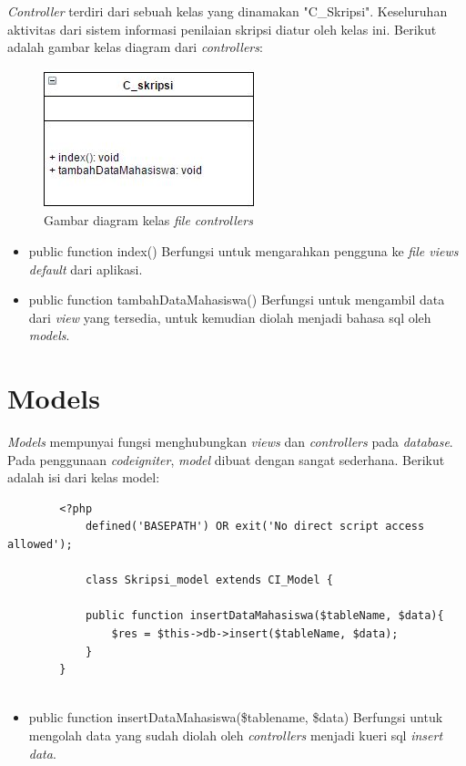 	\textit{Controller} terdiri dari sebuah kelas yang dinamakan "C\_Skripsi". Keseluruhan aktivitas dari sistem informasi penilaian skripsi diatur oleh kelas ini. Berikut adalah gambar kelas diagram dari \textit{controllers}:
	\begin{figure}[H]
		\centering
		\includegraphics[scale= 1.0]{Gambar/C_skripsi}
		\caption {Gambar diagram kelas \textit{file controllers}}
		\label{fig:controllers}
	\end{figure}
	
	\begin{itemize}
		\item public function index()
		Berfungsi untuk mengarahkan pengguna ke \textit{file views default} dari aplikasi.
		\item public function tambahDataMahasiswa()
		Berfungsi untuk mengambil data dari \textit{view} yang tersedia, untuk kemudian diolah menjadi bahasa sql oleh \textit{models}.
	\end{itemize}
	
	\section{Models}
	\label{sec: models}
	
	\textit{Models} mempunyai fungsi menghubungkan \textit{views} dan \textit{controllers} pada \textit{database}. Pada penggunaan \textit{codeigniter}, \textit{model} dibuat dengan sangat sederhana. Berikut adalah isi dari kelas model:
	\begin{lstlisting}
		<?php
			defined('BASEPATH') OR exit('No direct script access allowed');
			
			class Skripsi_model extends CI_Model {
			
			public function insertDataMahasiswa($tableName, $data){
				$res = $this->db->insert($tableName, $data);
			}
		}
		
	\end{lstlisting}
	
	\begin{itemize}
		\item public function insertDataMahasiswa(\$tablename, \$data)
		Berfungsi untuk mengolah data yang sudah diolah oleh \textit{controllers} menjadi kueri sql \textit{insert data}.
	\end{itemize}
	
